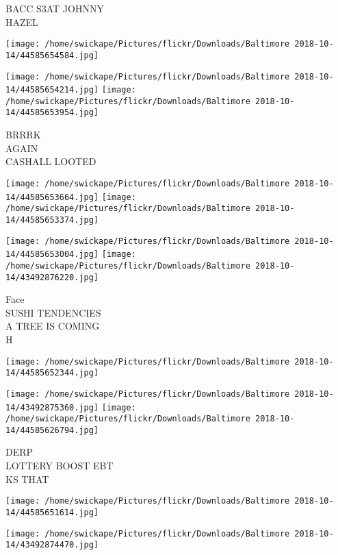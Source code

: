 \documentclass[10pt,letterpaper]{article}
\begin{document}
BACC S3AT JOHNNY\\
HAZEL\\
\pagebreak

\texttt{[image: /home/swickape/Pictures/flickr/Downloads/Baltimore 2018-10-14/44585654584.jpg]}

\vspace{0.25in}
\texttt{[image: /home/swickape/Pictures/flickr/Downloads/Baltimore 2018-10-14/44585654214.jpg]}
\texttt{[image: /home/swickape/Pictures/flickr/Downloads/Baltimore 2018-10-14/44585653954.jpg]}

BRRRK\\
AGAIN\\
CASHALL LOOTED\\
\pagebreak

\texttt{[image: /home/swickape/Pictures/flickr/Downloads/Baltimore 2018-10-14/44585653664.jpg]}
\texttt{[image: /home/swickape/Pictures/flickr/Downloads/Baltimore 2018-10-14/44585653374.jpg]}

\texttt{[image: /home/swickape/Pictures/flickr/Downloads/Baltimore 2018-10-14/44585653004.jpg]}
\texttt{[image: /home/swickape/Pictures/flickr/Downloads/Baltimore 2018-10-14/43492876220.jpg]}

Face\\
SUSHI TENDENCIES\\
A TREE IS COMING\\
H\\
\pagebreak

\texttt{[image: /home/swickape/Pictures/flickr/Downloads/Baltimore 2018-10-14/44585652344.jpg]}

\vspace{0.25in}
\texttt{[image: /home/swickape/Pictures/flickr/Downloads/Baltimore 2018-10-14/43492875360.jpg]}
\texttt{[image: /home/swickape/Pictures/flickr/Downloads/Baltimore 2018-10-14/44585626794.jpg]}

DERP\\
LOTTERY BOOST EBT\\
KS THAT\\
\pagebreak

\texttt{[image: /home/swickape/Pictures/flickr/Downloads/Baltimore 2018-10-14/44585651614.jpg]}

\vspace{0.25in}
\texttt{[image: /home/swickape/Pictures/flickr/Downloads/Baltimore 2018-10-14/43492874470.jpg]}
\end{document}
